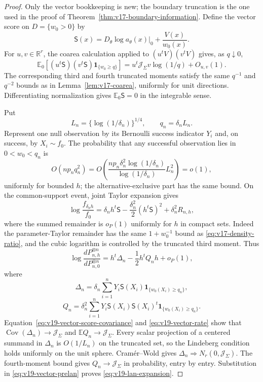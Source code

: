 \begin{proof}
Only the vector bookkeeping is new; the boundary truncation is the one used
in the proof of Theorem~\ref{thm:v17-boundary-information}.  Define the
vector score on $D=\{w_0>0\}$ by
\[
 \mathsf S(x)=D_\theta\log a_\theta(x)|_0+
                         \frac{V(x)}{w_0(x)}.
\]
For $u,v\in\mathbb R^r$, the coarea calculation applied to
$(u^tV)(v^tV)$ gives, as $q\downarrow0$,
\begin{equation}\label{eq:v19-vector-score-covariance}
 \mathbb E_0\!\left[(u^t\mathsf S)(v^t\mathsf S)
                 \mathbf1_{\{w_0\ge q\}}\right]
 =u^t\mathcal J_\Sigma v\log(1/q)+O_{u,v}(1).
\end{equation}
The corresponding third and fourth truncated moments satisfy the same
$q^{-1}$ and $q^{-2}$ bounds as in
Lemma~\ref{lem:v17-coarea}, uniformly for unit directions.  Differentiating
normalization gives $\mathbb E_0\mathsf S=0$ in the integrable sense.

Put
\[
 L_n=\{\log(1/\delta_n)\}^{1/4},\qquad q_n=\delta_nL_n.
\]
Represent one null observation by its Bernoulli success indicator $Y_i$ and,
on success, by $X_i\sim f_0$.  The probability that any successful
observation lies in $0<w_0<q_n$ is
\[
 O(np_nq_n^2)
 =O\!\left(
   \frac{np_n\delta_n^2\log(1/\delta_n)}
        {\log(1/\delta_n)}L_n^2\right)=o(1),
\]
uniformly for bounded $h$; the alternative-exclusive part has the same
bound.  On the common-support event, joint Taylor expansion gives
\[
 \log\frac{f_{\delta_nh}}{f_0}
 =\delta_n h^t\mathsf S
 -\frac{\delta_n^2}{2}(h^t\mathsf S)^2
 +\delta_n^2R_{n,h},
\]
where the summed remainder is $o_P(1)$ uniformly for $h$ in compact sets.
Indeed the parameter-Taylor remainder has the same
$1+w_0^{-1}$ bound as \eqref{eq:v17-density-ratio}, and the cubic logarithm
is controlled by the truncated third moment.  Thus
\begin{equation}\label{eq:v19-vector-prelan}
 \log\frac{dP_{n,h}^{\otimes n}}{dP_{n,0}^{\otimes n}}
 =h^t\Delta_n-\frac12 h^tQ_nh+o_P(1),
\end{equation}
where
\[
 \Delta_n=\delta_n\sum_{i=1}^nY_i
       \mathsf S(X_i)\mathbf1_{\{w_0(X_i)\ge q_n\}},
\]
\[
 Q_n=\delta_n^2\sum_{i=1}^nY_i
       \mathsf S(X_i)\mathsf S(X_i)^t
       \mathbf1_{\{w_0(X_i)\ge q_n\}}.
\]
Equation~\eqref{eq:v19-vector-score-covariance} and
\eqref{eq:v19-vector-rate} show that
$\operatorname{Cov}(\Delta_n)\to\mathcal J_\Sigma$ and
$\mathbb E Q_n\to\mathcal J_\Sigma$.  Every scalar projection of a
centered summand in $\Delta_n$ is $O(1/L_n)$ on the truncated set, so the
Lindeberg condition holds uniformly on the unit sphere.  Cram\'er--Wold
gives
$\Delta_n\Rightarrow N_r(0,\mathcal J_\Sigma)$.  The fourth-moment bound
gives $Q_n\to\mathcal J_\Sigma$ in probability, entry by entry.  Substitution
in \eqref{eq:v19-vector-prelan} proves \eqref{eq:v19-lan-expansion}.


\end{proof}

